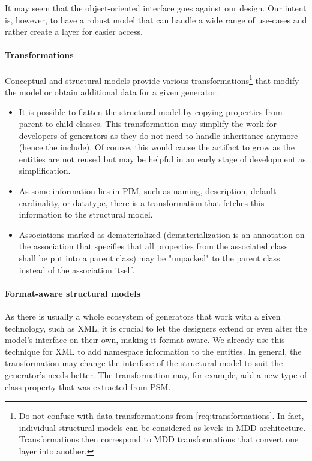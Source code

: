 It may seem that the object-oriented interface goes against our design. Our intent is, however, to have a robust model that can handle a wide range of use-cases and rather create a layer for easier access.

\paragraph{Transformations} Conceptual and structural models provide various transformations\footnote{Do not confuse with data transformations from \autoref{req:transformations}.  In fact, individual structural models can be considered as levels in MDD architecture. Transformations then correspond to MDD transformations that convert one layer into another.} that modify the model or obtain additional data for a given generator.

\begin{itemize}
    \item It is possible to flatten the structural model by copying properties from parent to child classes. This transformation may simplify the work for developers of generators as they do not need to handle inheritance anymore (hence the include). Of course, this would cause the artifact to grow as the entities are not reused but may be helpful in an early stage of development as simplification.
    \item As some information lies in PIM, such as naming, description, default cardinality, or datatype, there is a transformation that fetches this information to the structural model.
    \item Associations marked as dematerialized (dematerialization is an annotation on the association that specifies that all properties from the associated class shall be put into a parent class) may be "unpacked" to the parent class instead of the association itself.
\end{itemize}

\paragraph{Format-aware structural models} As there is usually a whole ecosystem of generators that work with a given technology, such as XML, it is crucial to let the designers extend or even alter the model's interface on their own, making it format-aware. We already use this technique for XML to add namespace information to the entities. In general, the transformation may change the interface of the structural model to suit the generator's needs better. The transformation may, for example, add a new type of class property that was extracted from PSM.

